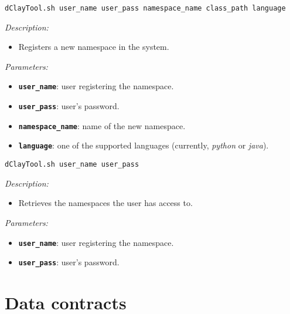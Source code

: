 \begin{dBox}
\texttt{dClayTool.sh  \newline user\_name user\_pass namespace\_name class\_path language}
\LINE

{\it Description:}

\begin{itemize}
    \item Registers a new namespace in the system.
\end{itemize}

{\it Parameters:}

\begin{itemize}
    \item \texttt{\bfseries user\_name}: user registering the namespace.
    \item \texttt{\bfseries user\_pass}: user's password.
    \item \texttt{\bfseries namespace\_name}: name of the new namespace.
    \item \texttt{\bfseries language}: one of the supported languages (currently, \textit{python} or \textit{java}).
\end{itemize}
 
\end{dBox}


\begin{dBox}
\texttt{dClayTool.sh  \newline user\_name user\_pass}
\LINE

{\it Description:}

\begin{itemize}
    \item Retrieves the namespaces the user has access to.
\end{itemize}

{\it Parameters:}

\begin{itemize}
    \item \texttt{\bfseries user\_name}: user registering the namespace.
    \item \texttt{\bfseries user\_pass}: user's password.
\end{itemize}
 
\end{dBox}


\section{Data contracts}

